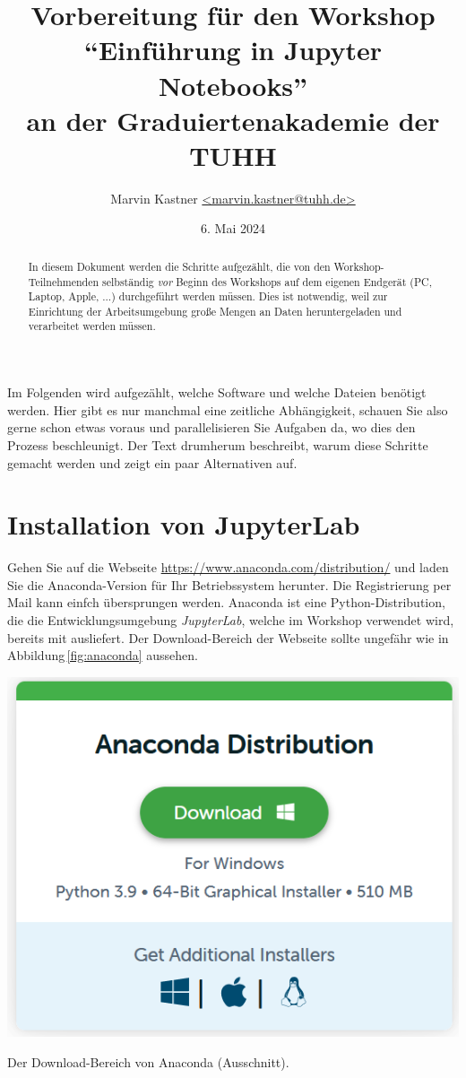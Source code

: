 \documentclass{tufte-handout}
\title{Vorbereitung für den Workshop\\
 \enquote{Einführung in Jupyter Notebooks}\\
 an der Graduiertenakademie der TUHH}
\author{Marvin Kastner \href{mailto:marvin.kastner@tuhh.de}{<marvin.kastner@tuhh.de>}}
\date{6. Mai 2024} %
\begin{document}
\maketitle%

\begin{abstract}
\noindent
In diesem Dokument werden die Schritte aufgezählt, die von den Workshop-Teilnehmenden selbständig \emph{vor} Beginn des Workshops auf dem eigenen Endgerät (PC, Laptop, Apple, ...) durchgeführt werden müssen.
Dies ist notwendig, weil zur Einrichtung der Arbeitsumgebung große Mengen an Daten heruntergeladen und verarbeitet werden müssen.
\end{abstract}

Im Folgenden wird aufgezählt, welche Software und welche Dateien benötigt werden.
Hier gibt es nur manchmal eine zeitliche Abhängigkeit, schauen Sie also gerne schon etwas voraus und parallelisieren Sie Aufgaben da, wo dies den Prozess beschleunigt.
Der Text drumherum beschreibt, warum diese Schritte gemacht werden und zeigt ein paar Alternativen auf.


\section{Installation von JupyterLab}

Gehen Sie auf die Webseite
\url{https://www.anaconda.com/distribution/} 
und laden Sie die Anaconda-Version für Ihr Betriebssystem herunter.
Die Registrierung per Mail kann einfch übersprungen werden.
Anaconda ist eine Python-Distribution, die die Entwicklungsumgebung \emph{JupyterLab}, welche im Workshop verwendet wird, bereits mit ausliefert.
Der Download-Bereich der Webseite sollte ungefähr wie in Abbildung\,\ref{fig:anaconda} aussehen.

\begin{marginfigure}
  \includegraphics{anaconda}
  \caption{Der Download-Bereich von Anaconda (Ausschnitt).}%
\label{fig:anaconda}
\end{marginfigure}
\end{document}
